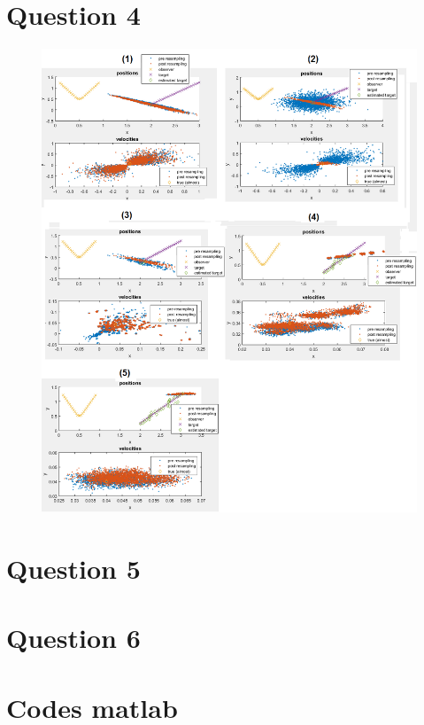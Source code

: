 \documentclass[english,DIV=13]{scrartcl}
\begin{document}
\section*{Question 4}
\begin{figure}
   \caption{\label{q4} }
   \includegraphics[width=\textwidth,height=\textheight,keepaspectratio]{q4.png}
\end{figure}

\section*{Question 5}


\section*{Question 6}


\section*{Codes matlab}

\end{document}
